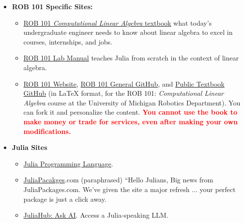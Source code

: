 \begin{itemize}
\item \textbf{ROB 101 Specific Sites:}
\begin{itemize}
    \item \href{https://www.dropbox.com/s/1pzva81t4shnd22/ROB_101_Textbook_11April2023.pdf?dl=0}{ROB 101 \textit{Computational Linear Algebra} textbook} what today's undergraduate engineer needs to know about linear algebra to excel in courses, internships, and jobs.
    \item \href{https://www.dropbox.com/s/lc4g6qqbnrb826n/ROB_101_Julia_Programming_Guide_31January2023.pdf?dl=0}{ROB 101 Lab Manual} teaches Julia from scratch in the context of linear algebra.
    \item \href{https://robotics.umich.edu/academics/courses/course-offerings/rob101-fall-2020/}{ROB 101 Website}, \href{https://github.com/michiganrobotics/rob101}{ROB 101 General GitHub}, and \href{https://github.com/michiganrobotics/ROB-101-Textbook-Computational-Linear-Algebra}{Public Textbook GitHub} (in LaTeX format, for the ROB 101: \textit{Computational Linear Algebra} course at the University of Michigan Robotics Department). You can fork it and personalize the content. \textcolor{red}{\bf You cannot use the book to make money or trade for services, even after making your own modifications.}
\end{itemize}

\item \textbf{Julia Sites}
\begin{itemize}
    \item \href{https://julialang.org/}{Julia Programming Language}.
    
     \item \href{https://juliapackages.com/}{JuliaPacakges}.com (paraphrased) ``Hello Julians, Big news from JuliaPackages.com. We’ve given the site a major refresh ... your perfect package is just a click away. 
    \item \href{https://info.juliahub.com/ask-ai-chat-gpt-juliahub}{JuliaHub: Ask AI}. Access a Julia-speaking LLM.
\end{itemize}  
   
  


\end{itemize}

